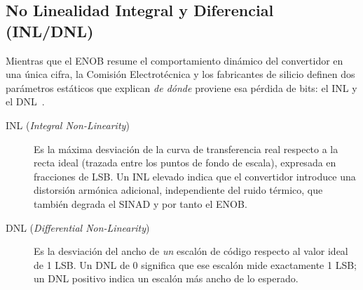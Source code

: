 
\subsection{No Linealidad Integral y Diferencial (INL/DNL)}\label{sec:inl_dnl}

Mientras que el ENOB resume el comportamiento dinámico del convertidor en una única cifra, la Comisión Electrotécnica y los fabricantes de silicio definen dos parámetros estáticos que explican \emph{de dónde} proviene esa pérdida de bits: el INL y el DNL~\cite{kester2005dataconversion}.

\begin{description}
    \item[INL (\textit{Integral Non-Linearity})] Es la máxima desviación de la curva de transferencia real respecto a la recta ideal (trazada entre los puntos de fondo de escala), expresada en fracciones de LSB. Un INL elevado indica que el convertidor introduce una distorsión armónica adicional, independiente del ruido térmico, que también degrada el SINAD y por tanto el ENOB.
    \item[DNL (\textit{Differential Non-Linearity})] Es la desviación del ancho de \emph{un} escalón de código respecto al valor ideal de 1 LSB. Un DNL de $0$ significa que ese escalón mide exactamente 1 LSB; un DNL positivo indica un escalón más ancho de lo esperado.
\end{description}

\begin{marginfigure}
    \centering
    \shorthandoff{>}
    \caption[Efecto del DNL sobre la transferencia real de un ADC.]{Curva de transferencia real (azul) frente a la ideal (gris). El escalón entre los códigos 3 y 4 nunca llega a producirse: es un \emph{código perdido} (\textit{missing code}), síntoma de un DNL $\leq -1$ LSB. Cuando esto ocurre el convertidor deja de ser monótono.}\label{fig:inl_dnl}
\end{marginfigure}

